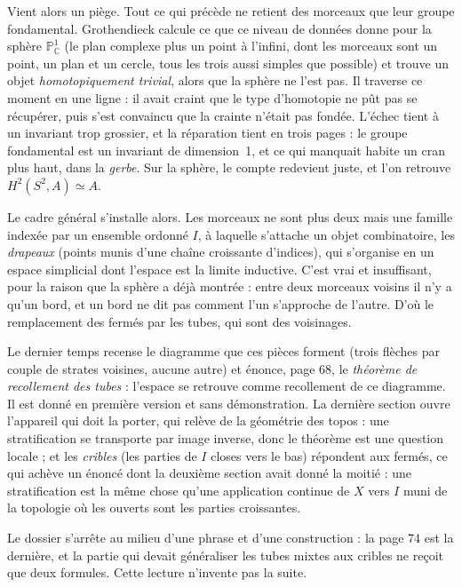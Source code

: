 \documentclass[11pt,a4paper]{article}
\begin{document}
\begin{resume}
Vient alors un piège. Tout ce qui
précède ne retient des morceaux que leur groupe fondamental. Grothendieck
calcule ce que ce niveau de données donne pour la sphère
$\mathbb{P}^{1}_{\mathbb{C}}$ (le plan complexe plus un point à l'infini, dont
les morceaux sont un point, un plan et un cercle, tous les trois aussi simples
que possible) et trouve un objet \emph{homotopiquement trivial}, alors que la
sphère ne l'est pas. Il traverse ce moment en une ligne : il avait craint que
le type d'homotopie ne pût pas se récupérer, puis s'est convaincu que la
crainte n'était pas fondée. L'échec tient à un invariant trop grossier, et la
réparation tient en trois pages : le groupe
fondamental est un invariant de dimension~1, et ce qui manquait habite un cran
plus haut, dans la \emph{gerbe}. Sur la sphère, le compte redevient juste, et l'on
retrouve $H^{2}(S^{2},A) \simeq A$.

Le cadre général s'installe alors. Les morceaux ne sont plus deux mais une
famille indexée par un ensemble ordonné $I$, à laquelle s'attache un objet
combinatoire, les \emph{drapeaux} (points munis d'une chaîne croissante
d'indices), qui s'organise en un espace simplicial dont l'espace est la limite
inductive. C'est vrai et insuffisant, pour la raison que la sphère a déjà
montrée : entre deux morceaux voisins il n'y a qu'un bord, et un bord ne dit
pas comment l'un s'approche de l'autre. D'où le remplacement des fermés par les
tubes, qui sont des voisinages.

Le dernier temps recense le diagramme que ces pièces forment (trois
flèches par couple de strates voisines, aucune autre) et énonce, page
68, le \emph{théorème de recollement des tubes} : l'espace se retrouve comme
recollement de ce diagramme. Il est donné en première version et sans
démonstration. La dernière section ouvre l'appareil qui doit la porter, qui
relève de la géométrie des topos : une stratification se transporte par image
inverse, donc le théorème est une question locale ; et les \emph{cribles} (les
parties de $I$ closes vers le bas) répondent aux fermés, ce qui achève un
énoncé dont la deuxième section avait donné la moitié : une stratification est
la même chose qu'une application continue de $X$ vers $I$ muni de la topologie où les
ouverts sont les parties croissantes.

Le dossier s'arrête au milieu d'une phrase et d'une construction : la page 74
est la dernière, et la partie qui devait généraliser les tubes mixtes aux
cribles ne reçoit que deux formules. Cette lecture n'invente pas la
suite.


\end{resume}
\end{document}
